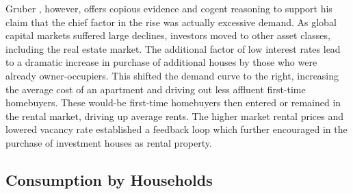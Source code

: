 \documentclass[12pt,a4paper,]{article}
\begin{document}
Gruber \autocite{gruberSep2016}, however, offers copious evidence and
cogent reasoning to support his claim that the chief factor in the rise
was actually excessive demand. As global capital markets suffered large
declines, investors moved to other asset classes, including the real
estate market. The additional factor of low interest rates lead to a
dramatic increase in purchase of additional houses by those who were
already owner-occupiers. This shifted the demand curve to the right,
increasing the average cost of an apartment and driving out less
affluent first-time homebuyers. These would-be first-time homebuyers
then entered or remained in the rental market, driving up average rents.
The higher market rental prices and lowered vacancy rate established a
feedback loop which further encouraged in the purchase of investment
houses as rental property.

\subsection{Consumption by Households}\label{consumption-by-households}
\end{document}
